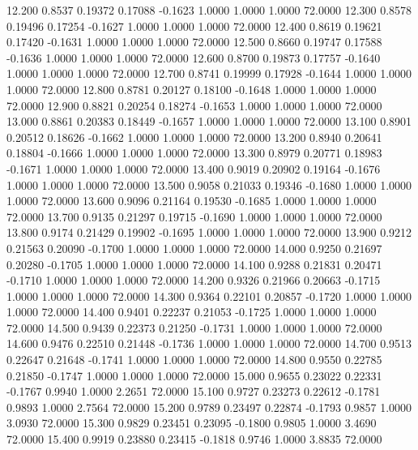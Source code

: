   12.200   0.8537   0.19372   0.17088  -0.1623   1.0000   1.0000   1.0000  72.0000
  12.300   0.8578   0.19496   0.17254  -0.1627   1.0000   1.0000   1.0000  72.0000
  12.400   0.8619   0.19621   0.17420  -0.1631   1.0000   1.0000   1.0000  72.0000
  12.500   0.8660   0.19747   0.17588  -0.1636   1.0000   1.0000   1.0000  72.0000
  12.600   0.8700   0.19873   0.17757  -0.1640   1.0000   1.0000   1.0000  72.0000
  12.700   0.8741   0.19999   0.17928  -0.1644   1.0000   1.0000   1.0000  72.0000
  12.800   0.8781   0.20127   0.18100  -0.1648   1.0000   1.0000   1.0000  72.0000
  12.900   0.8821   0.20254   0.18274  -0.1653   1.0000   1.0000   1.0000  72.0000
  13.000   0.8861   0.20383   0.18449  -0.1657   1.0000   1.0000   1.0000  72.0000
  13.100   0.8901   0.20512   0.18626  -0.1662   1.0000   1.0000   1.0000  72.0000
  13.200   0.8940   0.20641   0.18804  -0.1666   1.0000   1.0000   1.0000  72.0000
  13.300   0.8979   0.20771   0.18983  -0.1671   1.0000   1.0000   1.0000  72.0000
  13.400   0.9019   0.20902   0.19164  -0.1676   1.0000   1.0000   1.0000  72.0000
  13.500   0.9058   0.21033   0.19346  -0.1680   1.0000   1.0000   1.0000  72.0000
  13.600   0.9096   0.21164   0.19530  -0.1685   1.0000   1.0000   1.0000  72.0000
  13.700   0.9135   0.21297   0.19715  -0.1690   1.0000   1.0000   1.0000  72.0000
  13.800   0.9174   0.21429   0.19902  -0.1695   1.0000   1.0000   1.0000  72.0000
  13.900   0.9212   0.21563   0.20090  -0.1700   1.0000   1.0000   1.0000  72.0000
  14.000   0.9250   0.21697   0.20280  -0.1705   1.0000   1.0000   1.0000  72.0000
  14.100   0.9288   0.21831   0.20471  -0.1710   1.0000   1.0000   1.0000  72.0000
  14.200   0.9326   0.21966   0.20663  -0.1715   1.0000   1.0000   1.0000  72.0000
  14.300   0.9364   0.22101   0.20857  -0.1720   1.0000   1.0000   1.0000  72.0000
  14.400   0.9401   0.22237   0.21053  -0.1725   1.0000   1.0000   1.0000  72.0000
  14.500   0.9439   0.22373   0.21250  -0.1731   1.0000   1.0000   1.0000  72.0000
  14.600   0.9476   0.22510   0.21448  -0.1736   1.0000   1.0000   1.0000  72.0000
  14.700   0.9513   0.22647   0.21648  -0.1741   1.0000   1.0000   1.0000  72.0000
  14.800   0.9550   0.22785   0.21850  -0.1747   1.0000   1.0000   1.0000  72.0000
  15.000   0.9655   0.23022   0.22331  -0.1767   0.9940   1.0000   2.2651  72.0000
  15.100   0.9727   0.23273   0.22612  -0.1781   0.9893   1.0000   2.7564  72.0000
  15.200   0.9789   0.23497   0.22874  -0.1793   0.9857   1.0000   3.0930  72.0000
  15.300   0.9829   0.23451   0.23095  -0.1800   0.9805   1.0000   3.4690  72.0000
  15.400   0.9919   0.23880   0.23415  -0.1818   0.9746   1.0000   3.8835  72.0000
